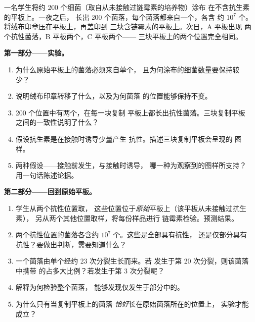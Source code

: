 \begin{problem}
\label{pb:g11:mutations:1}
一名学生将约 200 个细菌（取自从未接触过链霉素的培养物）涂布
在不含抗生素的平板上。一夜之后，
长出 200 个菌落，每个菌落都来自一个，各含
约 $10^7$ 个。将绒布印章压在平板上，再盖印到
三块含链霉素的平板上。次日，A 平板出现
两个抗性菌落，B 平板两个，C 平板两个——
三块平板上的两个位置完全相同。

\medskip
\noindent\textbf{第一部分——实验。}
\begin{enumerate}
  \item 为什么原始平板上的菌落必须来自单个，
        且为何涂布的细菌数量要保持较少？
  \item 说明绒布印章转移了什么，以及为何菌落
        的位置能够保持不变。
  \item 200 个位置中有两个，在每一块复制
        平板上都长出抗性菌落。三块复制平板
        之间的一致性说明了什么？
  \item 假设抗生素是在接触时诱导少量产生
        抗性。描述三块复制平板会呈现的
        图样。
  \item 两种假设——接触前发生，与接触时诱导，
        哪一种为观察到的图样所支持？
        用一句话陈述论据。
\end{enumerate}

\medskip
\noindent\textbf{第二部分——回到原始平板。}
\begin{enumerate}[resume]
  \item 学生从两个抗性位置取，
        这些位置位于\emph{原始}平板上（该平板从未接触过抗生素），
        另从两个其他位置取样，将每份样品进行
        链霉素检验。预测结果。
  \item 两个抗性位置的菌落各含约
        $10^7$ 个。这些是全部具有抗性，
        还是仅部分具有抗性？要做出判断，需要知道什么？
  \item 一个菌落由单个经约 23 次分裂生长而来。若
        发生于第 20 次分裂，则该菌落中携带
        的占多大比例？若发生于第 3 次分裂呢？
  \item 解释为何检验整个菌落，
        能够发现仅发生于部分中的。
  \item 为什么只有当复制平板上的菌落
        \emph{恰好}长在原始菌落所在的位置上，
        实验才能成立？
\end{enumerate}


\end{problem}
